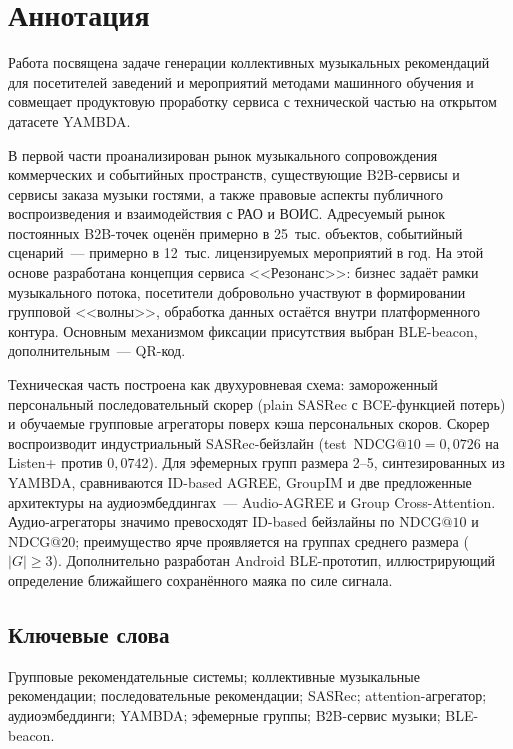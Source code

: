 \chapter*{Аннотация}

Работа посвящена задаче генерации коллективных музыкальных рекомендаций для посетителей заведений и мероприятий методами машинного обучения и совмещает продуктовую проработку сервиса с технической частью на открытом датасете YAMBDA.

В первой части проанализирован рынок музыкального сопровождения коммерческих и событийных пространств, существующие B2B-сервисы и сервисы заказа музыки гостями, а также правовые аспекты публичного воспроизведения и взаимодействия с РАО и ВОИС. Адресуемый рынок постоянных B2B-точек оценён примерно в 25~тыс. объектов, событийный сценарий~--- примерно в 12~тыс. лицензируемых мероприятий в год. На этой основе разработана концепция сервиса <<Резонанс>>: бизнес задаёт рамки музыкального потока, посетители добровольно участвуют в формировании групповой <<волны>>, обработка данных остаётся внутри платформенного контура. Основным механизмом фиксации присутствия выбран BLE-beacon, дополнительным~--- QR-код.

Техническая часть построена как двухуровневая схема: замороженный персональный последовательный скорер (plain SASRec с BCE-функцией потерь) и обучаемые групповые агрегаторы поверх кэша персональных скоров. Скорер воспроизводит индустриальный SASRec-бейзлайн (test~$\mathrm{NDCG@10} = 0{,}0726$ на Listen+ против $0{,}0742$). Для эфемерных групп размера 2--5, синтезированных из YAMBDA, сравниваются ID-based AGREE, GroupIM и две предложенные архитектуры на аудиоэмбеддингах~--- Audio-AGREE и Group Cross-Attention. Аудио-агрегаторы значимо превосходят ID-based бейзлайны по $\mathrm{NDCG@10}$ и $\mathrm{NDCG@20}$; преимущество ярче проявляется на группах среднего размера ($|G| \geq 3$). Дополнительно разработан Android BLE-прототип, иллюстрирующий определение ближайшего сохранённого маяка по силе сигнала.

\section*{Ключевые слова}

Групповые рекомендательные системы; коллективные музыкальные рекомендации; последовательные рекомендации; SASRec; attention-агрегатор; аудиоэмбеддинги; YAMBDA; эфемерные группы; B2B-сервис музыки; BLE-beacon.
